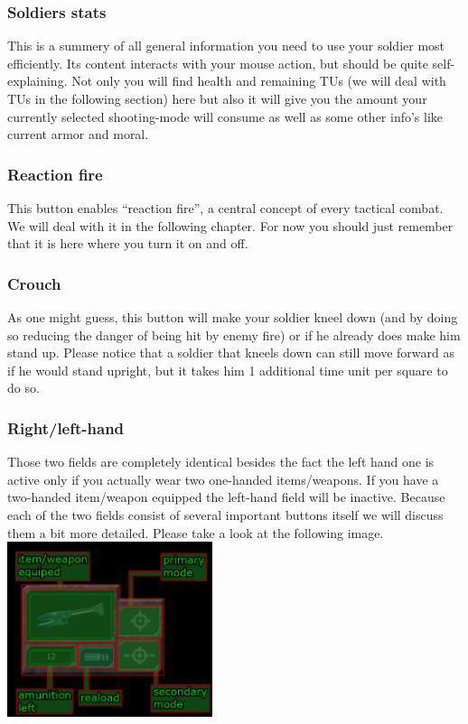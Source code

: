 \subsubsection{Soldiers stats}
This is a summery of all general information you need to use your soldier most efficiently. Its content interacts with your mouse action, but should be quite self-explaining. Not only you will find health and remaining TUs (we will deal with TUs in the following section) here but also it will give you the amount your currently selected shooting-mode will consume as well as some other info's like current armor and moral.
\subsubsection{Reaction fire}
This button enables ``reaction fire'', a central concept of every tactical combat. We will deal with it in the following chapter. For now you should just remember that it is here where you turn it on and off.
\subsubsection{Crouch}
As one might guess, this button will make your soldier kneel down (and by doing so reducing the danger of being hit by enemy fire) or if he already does make him stand up. Please notice that a soldier that kneels down can still move forward as if he would stand upright, but it takes him 1 additional time unit per square to do so.
\subsubsection{Right/left-hand}
Those two fields are completely identical besides the fact the left hand one is active only if you actually wear two one-handed items/weapons. If you have a two-handed item/weapon equipped the left-hand field will be inactive. Because each of the two fields consist of several important buttons itself we will discuss them a bit more detailed. Please take a look at the following image.\\
\includegraphics[width=6cm]{images/HUD_detail_final.jpg}
